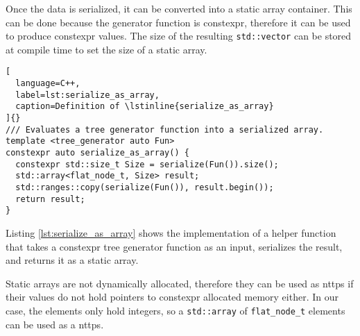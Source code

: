 \documentclass[../main]{subfiles}
\begin{document}
Once the data is serialized, it can be converted into a static array container.
This can be done because the generator function is \gls{constexpr}, therefore it
can be used to produce \gls{constexpr} values. The size of the resulting
\lstinline{std::vector} can be stored at compile time to set the size
of a static array.

\begin{lstlisting}[
  language=C++,
  label=lst:serialize_as_array,
  caption=Definition of \lstinline{serialize_as_array}
]{}
/// Evaluates a tree generator function into a serialized array.
template <tree_generator auto Fun>
constexpr auto serialize_as_array() {
  constexpr std::size_t Size = serialize(Fun()).size();
  std::array<flat_node_t, Size> result;
  std::ranges::copy(serialize(Fun()), result.begin());
  return result;
}
\end{lstlisting}

Listing \ref{lst:serialize_as_array} shows the implementation of a helper
function that takes a \gls{constexpr} tree generator function as an input,
serializes the result, and returns it as a static array.

Static arrays are not dynamically allocated, therefore they can be used as
\glspl{nttp} if their values do not hold pointers to
\gls{constexpr} allocated memory either.
In our case, the elements only hold integers, so a \lstinline{std::array} of
\lstinline{flat_node_t} elements can be used as a \glspl{nttp}.
\end{document}
